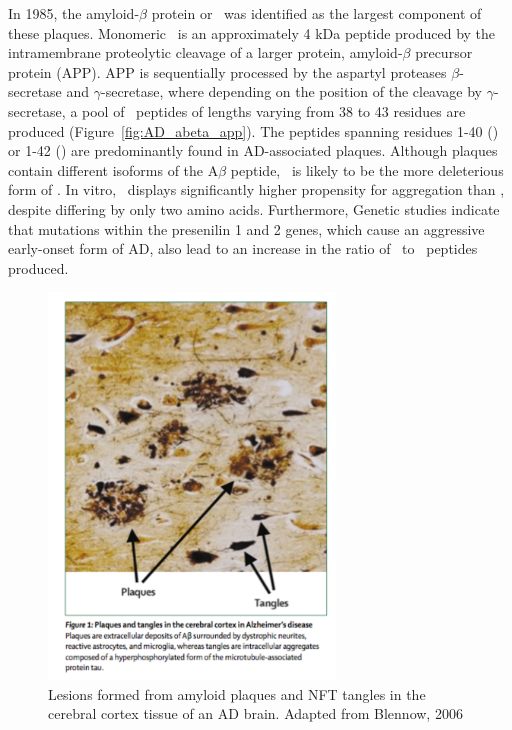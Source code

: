 In 1985, the amyloid-$\beta$ protein or \abeta\ was identified as the largest component of these plaques.\cite{Masters:1985wb}
Monomeric \abeta\ is an approximately 4 kDa peptide produced by the intramembrane proteolytic cleavage of a larger protein, amyloid-$\beta$ precursor protein (APP).\cite{Hardy:2002dh}
APP is sequentially processed by the aspartyl proteases $\beta$-secretase and $\gamma$-secretase, where depending on the position of the cleavage by $\gamma$-secretase, a pool of \abeta\ peptides of lengths varying from 38 to 43 residues are produced (Figure~\ref{fig:AD_abeta_app}).\cite{Gandy:2005dd} The peptides spanning residues 1-40 (\abetaforty) or 1-42 (\abetafortytwo) are predominantly found in AD-associated plaques.\cite{Golde:2000vg,Holtzman:2011gi} Although plaques contain different isoforms of the A$\beta$ peptide, \abetafortytwo\ is likely to be the more deleterious form of \abeta. In vitro, \abetafortytwo\ displays significantly higher propensity for aggregation than \abetaforty, despite differing by only two amino acids.\cite{Barrow:1992vz,Jarrett:1993ti,ElAgnaf:2000vr} Furthermore,  Genetic studies indicate that mutations within the presenilin 1 and 2 genes, which cause an aggressive early-onset form of AD, also lead to an increase in the ratio of \abetafortytwo\ to \abetaforty\ peptides produced.\cite{Hardy:1997tu,KumarSingh:2006kc,Bentahir:2006ih}

\begin{figure}
 \centering
 \includegraphics[width=3in]{figures/introduction/AD_tissue_pathology.pdf}
 \caption[AD tissue pathology]{Lesions formed from amyloid plaques and NFT tangles in the cerebral cortex tissue of an AD brain. Adapted from Blennow, 2006}
 \label{fig:AD_tissue_pathology}
\end{figure}

